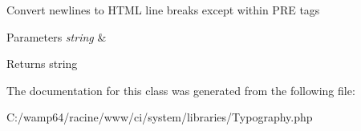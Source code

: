 Convert newlines to H\+T\+ML line breaks except within P\+RE tags


\begin{DoxyParams}{Parameters}
{\em string} & \\
\hline
\end{DoxyParams}
\begin{DoxyReturn}{Returns}
string 
\end{DoxyReturn}


The documentation for this class was generated from the following file\+:\begin{DoxyCompactItemize}
\item 
C\+:/wamp64/racine/www/ci/system/libraries/Typography.\+php\end{DoxyCompactItemize}
